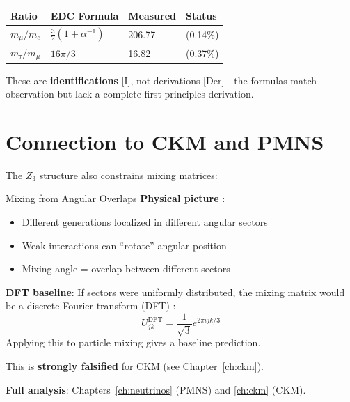 \begin{center}
\begin{tabular}{llll}
\toprule
\textbf{Ratio} & \textbf{EDC Formula} & \textbf{Measured} & \textbf{Status} \\
\midrule
$m_\mu/m_e$ & $\frac{3}{2}(1 + \alpha^{-1})$ & 206.77 & \tagI{} (0.14\%) \\
$m_\tau/m_\mu$ & $16\pi/3$ & 16.82 & \tagI{} (0.37\%) \\
\bottomrule
\end{tabular}
\end{center}

These are \textbf{identifications} [I], not derivations [Der]---the formulas
match observation but lack a complete first-principles derivation.

\section{Connection to CKM and PMNS}
\label{sec:ckm_pmns}

The $Z_3$ structure also constrains mixing matrices:

\begin{mechanism}{Mixing from Angular Overlaps}
\textbf{Physical picture} \tagP{}:
\begin{itemize}[nosep]
\item Different generations localized in different angular sectors
\item Weak interactions can ``rotate'' angular position
\item Mixing angle = overlap between different sectors
\end{itemize}

\textbf{DFT baseline}:
If sectors were uniformly distributed, the mixing matrix would be a
discrete Fourier transform (DFT) \tagM{}:
\begin{equation}
U_{jk}^{\text{DFT}} = \frac{1}{\sqrt{3}} e^{2\pi i jk/3}
\end{equation}
Applying this to particle mixing \tagI{} gives a baseline prediction.

This is \textbf{strongly falsified} for CKM (see Chapter~\ref{ch:ckm}).
\end{mechanism}

\textbf{Full analysis}: Chapters~\ref{ch:neutrinos} (PMNS) and \ref{ch:ckm} (CKM).


